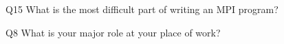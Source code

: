 \begin{description}%
\item{Q15} What is the most difficult part of writing an MPI program?%
\item{Q8} What is your major role at your place of work?%
\end{description}%
